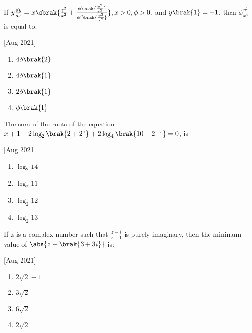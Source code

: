    \item If $y\frac{dy}{dx}=x\sbrak{\frac{y^2}{x^2}+\frac{\phi\brak{\frac{y^2}{x^2}}}{\phi'\brak{\frac{y^2}{x^2}}}},x>0,\phi>0$, and $y\brak{1}=-1$, then $\phi\frac{y^2}{x^4}$ is equal to:
    
    \hfill[Aug 2021]

        \begin{multicols}{4}
            \begin{enumerate}
                \item $4\phi\brak{2}$
                \item $4\phi\brak{1}$
                \item $2\phi\brak{1}$
                \item $\phi\brak{1}$
            \end{enumerate}
        \end{multicols}
        
    \item The sum of the roots of the equation $x+1-2\log_2\brak{2+2^x}+2\log_4\brak{10-2^{-x}}=0$, is:
    
    \hfill[Aug 2021]

        \begin{multicols}{4}
            \begin{enumerate}
                \item $\log_2 14$
                \item $\log_2 11$
                \item $\log_2 12$
                \item $\log_2 13$
            \end{enumerate}
        \end{multicols}

    \item If z is a complex number such that $\frac{z-i}{z-1}$ is purely imaginary, then the minimum value of $\abs{z-\brak{3+3i}}$ is:
    
    \hfill[Aug 2021]

        \begin{multicols}{4}
            \begin{enumerate}
                \item $2\sqrt{2}-1$
                \item $3\sqrt{2}$
                \item $6\sqrt{2}$
                \item $2\sqrt{2}$
            \end{enumerate}
        \end{multicols}

